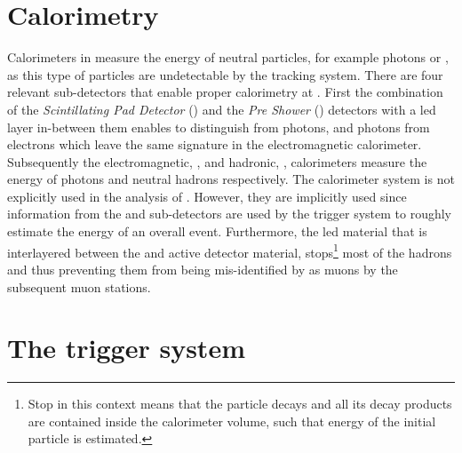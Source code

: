 \section{Calorimetry}
\label{det_calo}
Calorimeters in \lhcb measure the energy of neutral particles, for example photons or \piz,
as this type of particles are undetectable by the tracking system. There are four relevant sub-detectors
that enable proper calorimetry at \lhcb. First the combination of the {\it Scintillating Pad Detector} (\spd)
and the {\it Pre Shower} (\presh) detectors with a led layer in-between them enables to distinguish \piz from
photons, and photons from electrons which leave the same signature in the electromagnetic calorimeter.
Subsequently the electromagnetic, \ecal, and hadronic, \hcal, calorimeters measure the energy of photons
and neutral hadrons respectively. The calorimeter system is not explicitly used in the analysis of .
However, they are implicitly used since information from the \spd and \presh sub-detectors are used
by the \lzero trigger system to roughly estimate the energy of an overall event. Furthermore, the
led material that is interlayered between the \ecal and \hcal active detector material, stops\footnote{Stop
in this context means that the particle decays and all its decay products are contained inside the calorimeter
volume, such that energy of the initial particle is estimated.} most of the hadrons and thus preventing them
from being mis-identified by as muons by the subsequent muon stations.

\section{The trigger system}
\label{det_trigger}


%

